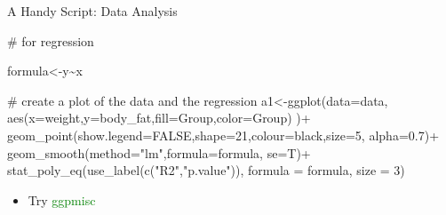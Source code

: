 \documentclass[
  ignorenonframetext,
]{beamer}
\newenvironment{Shaded}{\begin{snugshade}}{\end{snugshade}}
\newcommand{\AttributeTok}[1]{\textcolor[rgb]{0.40,0.45,0.13}{#1}}
\newcommand{\CommentTok}[1]{\textcolor[rgb]{0.37,0.37,0.37}{#1}}
\newcommand{\ConstantTok}[1]{\textcolor[rgb]{0.56,0.35,0.01}{#1}}
\newcommand{\DecValTok}[1]{\textcolor[rgb]{0.68,0.00,0.00}{#1}}
\newcommand{\FloatTok}[1]{\textcolor[rgb]{0.68,0.00,0.00}{#1}}
\newcommand{\FunctionTok}[1]{\textcolor[rgb]{0.28,0.35,0.67}{#1}}
\newcommand{\NormalTok}[1]{\textcolor[rgb]{0.00,0.23,0.31}{#1}}
\newcommand{\OtherTok}[1]{\textcolor[rgb]{0.00,0.23,0.31}{#1}}
\newcommand{\SpecialCharTok}[1]{\textcolor[rgb]{0.37,0.37,0.37}{#1}}
\newcommand{\StringTok}[1]{\textcolor[rgb]{0.13,0.47,0.30}{#1}}
\providecommand{\tightlist}{%
  \setlength{\itemsep}{0pt}\setlength{\parskip}{0pt}}\usepackage{longtable,booktabs,array}
\begin{document}
\begin{frame}[fragile]{A Handy Script: Data Analysis}
\protect\hypertarget{a-handy-script-data-analysis}{}
\footnotesize

\begin{Shaded}
\begin{Highlighting}[]
\CommentTok{\# for regression}

\NormalTok{formula}\OtherTok{\textless{}{-}}\NormalTok{y}\SpecialCharTok{\textasciitilde{}}\NormalTok{x}

\CommentTok{\# create a plot of the data and the regression}
\NormalTok{a1}\OtherTok{\textless{}{-}}\FunctionTok{ggplot}\NormalTok{(}\AttributeTok{data=}\NormalTok{data,}
           \FunctionTok{aes}\NormalTok{(}\AttributeTok{x=}\NormalTok{weight,}\AttributeTok{y=}\NormalTok{body\_fat,}\AttributeTok{fill=}\NormalTok{Group,}\AttributeTok{color=}\NormalTok{Group)}
\NormalTok{           )}\SpecialCharTok{+}
    \FunctionTok{geom\_point}\NormalTok{(}\AttributeTok{show.legend=}\ConstantTok{FALSE}\NormalTok{,}\AttributeTok{shape=}\DecValTok{21}\NormalTok{,}\AttributeTok{colour=}\StringTok{\textquotesingle{}black\textquotesingle{}}\NormalTok{,}\AttributeTok{size=}\DecValTok{5}\NormalTok{,}
               \AttributeTok{alpha=}\FloatTok{0.7}\NormalTok{)}\SpecialCharTok{+}
    \FunctionTok{geom\_smooth}\NormalTok{(}\AttributeTok{method=}\StringTok{"lm"}\NormalTok{,}\AttributeTok{formula=}\NormalTok{formula, }\AttributeTok{se=}\NormalTok{T)}\SpecialCharTok{+}
    \FunctionTok{stat\_poly\_eq}\NormalTok{(}\FunctionTok{use\_label}\NormalTok{(}\FunctionTok{c}\NormalTok{(}\StringTok{"R2"}\NormalTok{,}\StringTok{"p.value"}\NormalTok{)), }
                 \AttributeTok{formula =}\NormalTok{ formula, }\AttributeTok{size =} \DecValTok{3}\NormalTok{)}
\end{Highlighting}
\end{Shaded}

\normalsize

\begin{itemize}[<+->]
\tightlist
\item
  Try \textcolor{green}{{ggpmisc}}
\end{itemize}
\end{frame}
\end{document}
